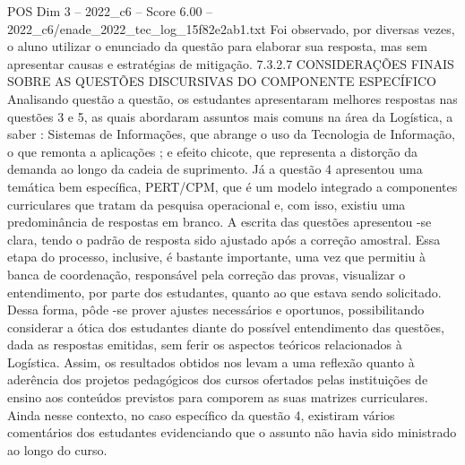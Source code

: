 \begin{textsample}{POS Dim 3 – 2022\_c6 – Score 6.00 – 2022\_c6/enade\_2022\_tec\_log\_15f82e2ab1.txt}
Foi observado, por diversas vezes, o aluno utilizar o enunciado da questão para elaborar sua resposta, mas sem apresentar causas e estratégias de mitigação. 7.3.2.7 CONSIDERAÇÕES FINAIS SOBRE AS QUESTÕES DISCURSIVAS DO COMPONENTE ESPECÍFICO Analisando questão a questão, os estudantes apresentaram melhores respostas nas questões 3 e 5, as quais abordaram assuntos mais comuns na área da Logística, a saber : Sistemas de Informações, que abrange o uso da Tecnologia de Informação, o que remonta a aplicações ; e efeito chicote, que representa a distorção da demanda ao longo da cadeia de suprimento.
Já a questão 4 apresentou uma temática bem específica, PERT/CPM, que é um modelo integrado a componentes curriculares que tratam da pesquisa operacional e, com isso, existiu uma predominância de respostas em branco.
A escrita das questões apresentou -se clara, tendo o padrão de resposta sido ajustado após a correção amostral.
Essa etapa do processo, inclusive, é bastante importante, uma vez que permitiu à banca de coordenação, responsável pela correção das provas, visualizar o entendimento, por parte dos estudantes, quanto ao que estava sendo solicitado.
Dessa forma, pôde -se prover ajustes necessários e oportunos, possibilitando considerar a ótica dos estudantes diante do possível entendimento das questões, dada as respostas emitidas, sem ferir os aspectos teóricos relacionados à Logística.
Assim, os resultados obtidos nos levam a uma reflexão quanto à aderência dos projetos pedagógicos dos cursos ofertados pelas instituições de ensino aos conteúdos previstos para comporem as suas matrizes curriculares.
Ainda nesse contexto, no caso específico da questão 4, existiram vários comentários dos estudantes evidenciando que o assunto não havia sido ministrado ao longo do curso.

\end{textsample}
